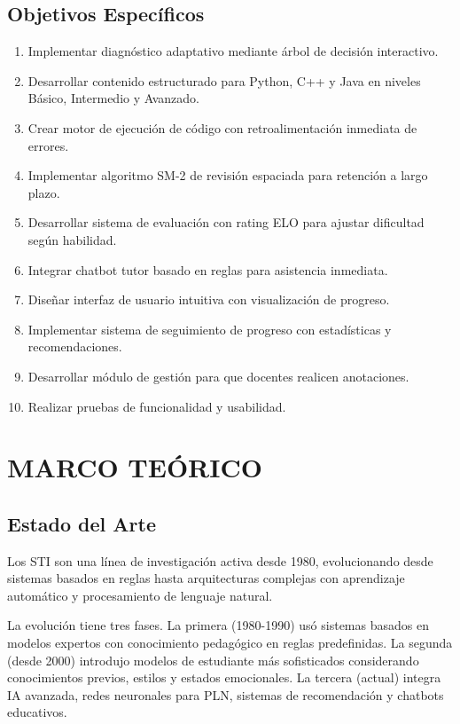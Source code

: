 \documentclass[12pt,letterpaper]{article}
\begin{document}
\subsection{Objetivos Específicos}

\begin{enumerate}
\item Implementar diagnóstico adaptativo mediante árbol de decisión interactivo.
\item Desarrollar contenido estructurado para Python, C++ y Java en niveles Básico, Intermedio y Avanzado.
\item Crear motor de ejecución de código con retroalimentación inmediata de errores.
\item Implementar algoritmo SM-2 de revisión espaciada para retención a largo plazo.
\item Desarrollar sistema de evaluación con rating ELO para ajustar dificultad según habilidad.
\item Integrar chatbot tutor basado en reglas para asistencia inmediata.
\item Diseñar interfaz de usuario intuitiva con visualización de progreso.
\item Implementar sistema de seguimiento de progreso con estadísticas y recomendaciones.
\item Desarrollar módulo de gestión para que docentes realicen anotaciones.
\item Realizar pruebas de funcionalidad y usabilidad.
\end{enumerate}

\section{MARCO TEÓRICO}

\subsection{Estado del Arte}

Los STI son una línea de investigación activa desde 1980, evolucionando desde sistemas basados en reglas hasta arquitecturas complejas con aprendizaje automático y procesamiento de lenguaje natural.

La evolución tiene tres fases. La primera (1980-1990) usó sistemas basados en modelos expertos con conocimiento pedagógico en reglas predefinidas. La segunda (desde 2000) introdujo modelos de estudiante más sofisticados considerando conocimientos previos, estilos y estados emocionales. La tercera (actual) integra IA avanzada, redes neuronales para PLN, sistemas de recomendación y chatbots educativos.
\end{document}
